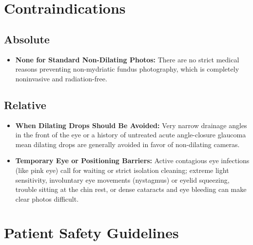\section{Contraindications}

\subsection{Absolute}

\begin{itemize}
    \item \textbf{None for Standard Non-Dilating Photos:} There are no strict medical reasons preventing non-mydriatic fundus photography, which is completely noninvasive and radiation-free.
\end{itemize}

\subsection{Relative}

\begin{itemize}
    \item \textbf{When Dilating Drops Should Be Avoided:} Very narrow drainage angles in the front of the eye or a history of untreated acute angle-closure glaucoma mean dilating drops are generally avoided in favor of non-dilating cameras.
    \item \textbf{Temporary Eye or Positioning Barriers:} Active contagious eye infections (like pink eye) call for waiting or strict isolation cleaning; extreme light sensitivity, involuntary eye movements (nystagmus) or eyelid squeezing, trouble sitting at the chin rest, or dense cataracts and eye bleeding can make clear photos difficult.
\end{itemize}

\section{Patient Safety Guidelines}

